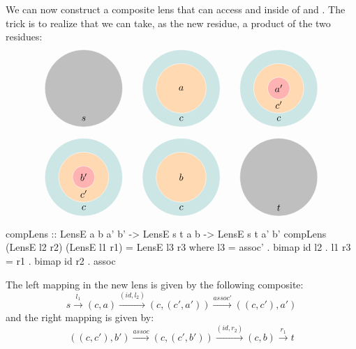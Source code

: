 \documentclass[DaoFP]{subfiles}
\begin{document}
We can now construct a composite lens that can access  and  inside of  and . The trick is to realize that we can take, as the new residue, a product of the two residues:
\[
\begin{tikzpicture}
\filldraw[fill=gray!50, draw=white] (0, 0) circle (1.4);
\node at (0, -1.1) {$s$};
\end{tikzpicture}
\hspace{20pt}
\begin{tikzpicture}
\filldraw[fill=blue!50!green!20, draw=white] (0, 0) circle (1.4);
\filldraw[fill=orange!30, draw=white] (0, 0) circle (0.9);
\node at (0, 0) {$a$};
\node at (0, -1.1) {$c$};
\end{tikzpicture}
\hspace{20pt}
\begin{tikzpicture}
\filldraw[fill=blue!50!green!20, draw=white] (0, 0) circle (1.4);
\filldraw[fill=orange!30, draw=white] (0, 0) circle (0.9);
\filldraw[fill=red!30, draw=white] (0, 0) circle (0.4);
\node at (0, 0) {$a'$};
\node at (0, -0.6) {$c'$};
\node at (0, -1.1) {$c$};
\end{tikzpicture}
\]

\[
\begin{tikzpicture}
\filldraw[fill=blue!50!green!20, draw=white] (0, 0) circle (1.4);
\filldraw[fill=orange!30, draw=white] (0, 0) circle (0.9);
\filldraw[fill=red!30, draw=white] (0, 0) circle (0.4);
\node at (0, 0) {$b'$};
\node at (0, -0.6) {$c'$};
\node at (0, -1.1) {$c$};
\end{tikzpicture}
\hspace{20pt}
\begin{tikzpicture}
\filldraw[fill=blue!50!green!20, draw=white] (0, 0) circle (1.4);
\filldraw[fill=orange!30, draw=white] (0, 0) circle (0.9);
\node at (0, 0) {$b$};
\node at (0, -1.1) {$c$};
\end{tikzpicture}
\hspace{20pt}
\begin{tikzpicture}
\filldraw[fill=gray!50, draw=white] (0, 0) circle (1.4);
\node at (0, -1.1) {$t$};
\end{tikzpicture}
\]



\begin{haskell}
compLens :: LensE a b a' b' -> LensE s t a b -> LensE s t a' b'
compLens (LensE l2 r2) (LensE l1 r1) = LensE l3 r3
  where l3 = assoc' . bimap id l2  . l1
        r3 = r1 . bimap id r2 . assoc
\end{haskell}
The left mapping in the new lens is given by the following composite:
\[ s \xrightarrow{l_1} (c, a)   \xrightarrow{(id, l_2)} (c, (c', a'))  \xrightarrow{assoc'} ((c, c'), a')\]
and the right mapping is given by:
\[ ((c, c'), b') \xrightarrow{assoc}  (c, (c', b')) \xrightarrow{(id, r_2)} (c, b) \xrightarrow{r_1} t \]
\end{document}
